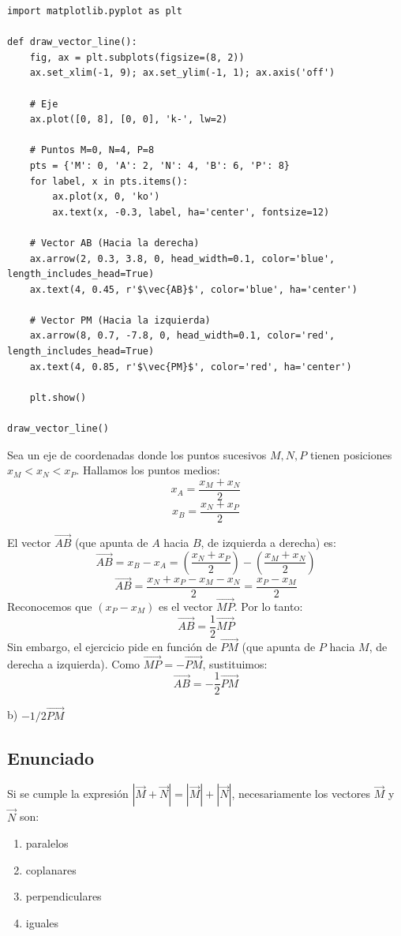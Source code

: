 \documentclass[12pt, a4paper]{article}
\begin{document}
\begin{lstlisting}
import matplotlib.pyplot as plt

def draw_vector_line():
    fig, ax = plt.subplots(figsize=(8, 2))
    ax.set_xlim(-1, 9); ax.set_ylim(-1, 1); ax.axis('off')
    
    # Eje
    ax.plot([0, 8], [0, 0], 'k-', lw=2)
    
    # Puntos M=0, N=4, P=8
    pts = {'M': 0, 'A': 2, 'N': 4, 'B': 6, 'P': 8}
    for label, x in pts.items():
        ax.plot(x, 0, 'ko')
        ax.text(x, -0.3, label, ha='center', fontsize=12)
        
    # Vector AB (Hacia la derecha)
    ax.arrow(2, 0.3, 3.8, 0, head_width=0.1, color='blue', length_includes_head=True)
    ax.text(4, 0.45, r'$\vec{AB}$', color='blue', ha='center')
    
    # Vector PM (Hacia la izquierda)
    ax.arrow(8, 0.7, -7.8, 0, head_width=0.1, color='red', length_includes_head=True)
    ax.text(4, 0.85, r'$\vec{PM}$', color='red', ha='center')
    
    plt.show()

draw_vector_line()
\end{lstlisting}

Sea un eje de coordenadas donde los puntos sucesivos $M, N, P$ tienen posiciones $x_M < x_N < x_P$.
Hallamos los puntos medios:
$$ x_A = \frac{x_M + x_N}{2} $$
$$ x_B = \frac{x_N + x_P}{2} $$

El vector $\vec{AB}$ (que apunta de $A$ hacia $B$, de izquierda a derecha) es:
$$ \vec{AB} = x_B - x_A = \left(\frac{x_N + x_P}{2}\right) - \left(\frac{x_M + x_N}{2}\right) $$
$$ \vec{AB} = \frac{x_N + x_P - x_M - x_N}{2} = \frac{x_P - x_M}{2} $$
Reconocemos que $(x_P - x_M)$ es el vector $\vec{MP}$. Por lo tanto:
$$ \vec{AB} = \frac{1}{2} \vec{MP} $$
Sin embargo, el ejercicio pide en función de $\vec{PM}$ (que apunta de $P$ hacia $M$, de derecha a izquierda). Como $\vec{MP} = -\vec{PM}$, sustituimos:
$$ \vec{AB} = -\frac{1}{2} \vec{PM} $$

\begin{tcolorbox}[colback=green!5!white, colframe=green!50!black, title=Respuesta Final]
\centering \Large b) $-1/2 \vec{PM}$
\end{tcolorbox}

\newpage


\subsection*{Enunciado}
Si se cumple la expresión $|\vec{M} + \vec{N}| = |\vec{M}| + |\vec{N}|$, necesariamente los vectores $\vec{M}$ y $\vec{N}$ son:
\begin{enumerate}[label=\alph*)]
    \item paralelos
    \item coplanares
    \item perpendiculares
    \item iguales
\end{enumerate}
\end{document}
